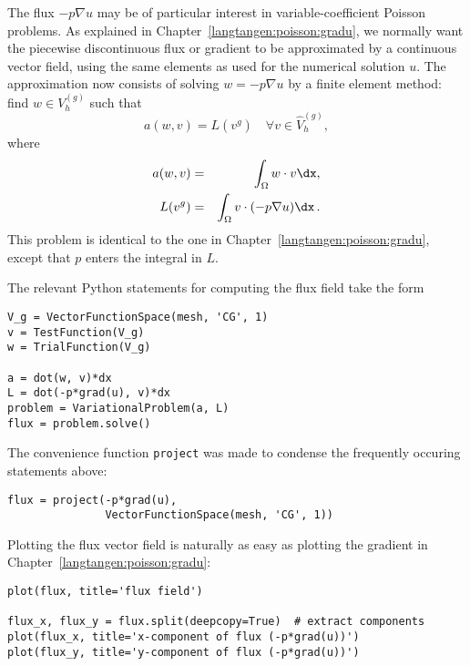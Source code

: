 The flux $-p\nabla u$ may be of particular interest in variable-coefficient
Poisson
problems. As explained in Chapter~\ref{langtangen:poisson:gradu},
we normally want the piecewise discontinuous flux or gradient
to be approximated by a continuous vector field, using the same elements
as used for the numerical solution $u$. The approximation now consists of
solving $w = -p\nabla u$ by a finite element method:
find $w\in V^{(g)}_h$ such that
\begin{equation}
a(w, v) = L(v^{g})\quad\forall v\in \hat{V}_h^{(g)},
\end{equation}
where
\begin{eqnarray}
a(w, v) &=& \int_\Omega w\cdot v\dx,\\
L(v^{g}) &=& \int_\Omega v\cdot (-p \nabla u)\dx\langtangenep
\end{eqnarray}
This problem is identical to the one in Chapter~\ref{langtangen:poisson:gradu},
except that $p$ enters the integral in $L$.

The relevant Python statements for computing the flux field take the form
\begin{Verbatim}[fontsize=\fontsize{10pt}{10pt},tabsize=8,baselinestretch=1.05,
fontfamily=tt,xleftmargin=7mm]
V_g = VectorFunctionSpace(mesh, 'CG', 1)
v = TestFunction(V_g)
w = TrialFunction(V_g)

a = dot(w, v)*dx
L = dot(-p*grad(u), v)*dx
problem = VariationalProblem(a, L)
flux = problem.solve()
\end{Verbatim}
\noindent
The convenience function {\fontsize{12pt}{12pt}\texttt{project}} was made to condense the frequently
occuring statements above:
\begin{Verbatim}[fontsize=\fontsize{10pt}{10pt},tabsize=8,baselinestretch=1.05,
fontfamily=tt,xleftmargin=7mm]
flux = project(-p*grad(u), 
               VectorFunctionSpace(mesh, 'CG', 1))
\end{Verbatim}
\noindent

Plotting the flux vector field is naturally as easy as plotting
the gradient in Chapter~\ref{langtangen:poisson:gradu}:
\begin{Verbatim}[fontsize=\fontsize{10pt}{10pt},tabsize=8,baselinestretch=1.05,
fontfamily=tt,xleftmargin=7mm]
plot(flux, title='flux field')

flux_x, flux_y = flux.split(deepcopy=True)  # extract components
plot(flux_x, title='x-component of flux (-p*grad(u))')
plot(flux_y, title='y-component of flux (-p*grad(u))')
\end{Verbatim}
\noindent

